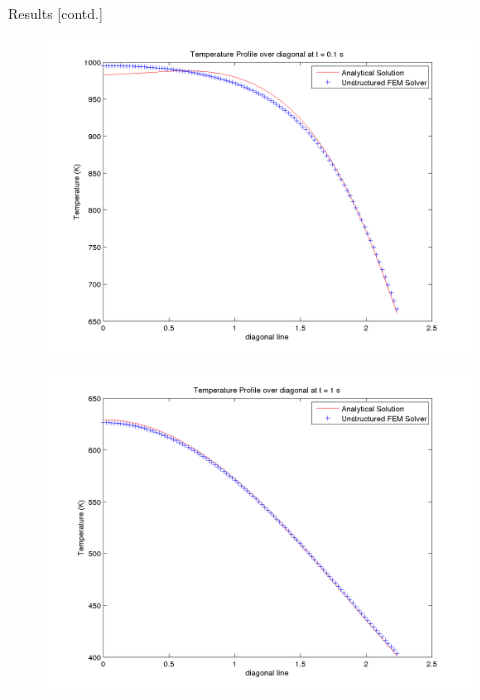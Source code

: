 \documentclass[t,english]{beamer}
\begin{document}
\begin{frame}[c]{Results [contd.]}
\begin{multicols}{2}
\begin{figure}[ht!]
\centering
\includegraphics[trim=100 0 0 50,scale=0.31]{billet01.png}
\end{figure}

\columnbreak

\begin{figure}[ht!]
\centering
\includegraphics[trim=50 0 0 50,scale=0.31]{billet1.png}
\end{figure}
\end{multicols}
\end{frame}
\end{document}
